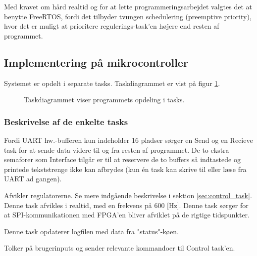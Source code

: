 Med kravet om hård realtid og for at lette programmeringsarbejdet valgtes det at
benytte FreeRTOS, fordi det tilbyder tvungen schedulering (preemptive priority), hvor det er muligt
at prioritere regulerings-task'en højere end resten af programmet.

%
\subsection{Implementering på mikrocontroller}
% 
% 
Systemet er opdelt i separate tasks.
Taskdiagrammet er vist på figur \ref{fig:task_diagram}. 

\begin{figure}[!h]
\centering
\begin{tikzpicture}[node distance = 3.2cm]
	
\end{tikzpicture}
\caption[Taskdiagram]{Taskdiagrammet viser programmets opdeling i tasks.}
\label{fig:task_diagram}
\end{figure}

\subsubsection{Beskrivelse af de enkelte tasks}
\begin{description}
\itemsep-3pt
	\item[UART send og -receive] Fordi UART hw.-bufferen kun indeholder 16 pladser \citep[Side. 430]{lm3s6965}
	sørger en Send og en Recieve task for at sende data videre til og fra resten af programmet.
	De to ekstra semaforer som Interface tilgår er til at reservere de to buffers så indtastede og
	printede tekststrenge ikke kan afbrydes (kun én task kan skrive til eller læse fra UART ad gangen).
	\item[Control] Afvikler regulatorerne. Se mere indgående beskrivelse i sektion \ref{sec:control_task}.
	Denne task afvikles i realtid, med en frekvens på 600 [Hz]. 
	Denne task sørger for at SPI-kommunikationen med FPGA'en bliver afviklet på de rigtige tidspunkter.
	\item[Logger] Denne task opdaterer logfilen med data fra "status"-køen.
	\item[Interface] Tolker på brugerinputs og sender relevante kommandoer til Control task'en.
\end{description}

